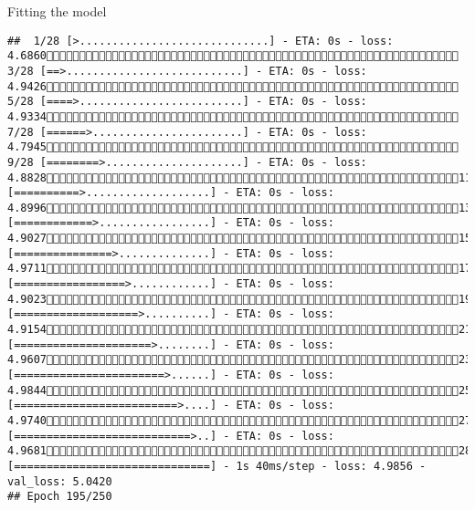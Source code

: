 \documentclass[
  ignorenonframetext,
]{beamer}
\begin{document}
\begin{frame}[fragile]{Fitting the model}
\begin{verbatim}
##  1/28 [>.............................] - ETA: 0s - loss: 4.6860 3/28 [==>...........................] - ETA: 0s - loss: 4.9426 5/28 [====>.........................] - ETA: 0s - loss: 4.9334 7/28 [======>.......................] - ETA: 0s - loss: 4.7945 9/28 [========>.....................] - ETA: 0s - loss: 4.882811/28 [==========>...................] - ETA: 0s - loss: 4.899613/28 [============>.................] - ETA: 0s - loss: 4.902715/28 [===============>..............] - ETA: 0s - loss: 4.971117/28 [=================>............] - ETA: 0s - loss: 4.902319/28 [===================>..........] - ETA: 0s - loss: 4.915421/28 [=====================>........] - ETA: 0s - loss: 4.960723/28 [=======================>......] - ETA: 0s - loss: 4.984425/28 [=========================>....] - ETA: 0s - loss: 4.974027/28 [===========================>..] - ETA: 0s - loss: 4.968128/28 [==============================] - 1s 40ms/step - loss: 4.9856 - val_loss: 5.0420
## Epoch 195/250

\end{verbatim}
\end{frame}
\end{document}
